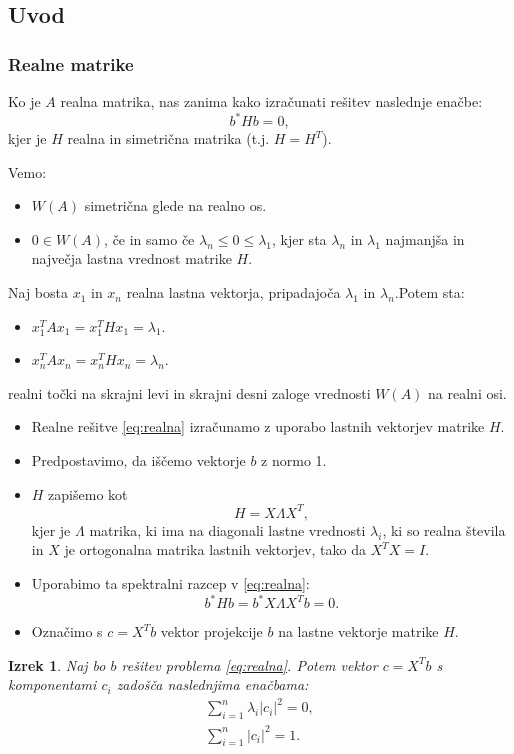 \documentclass{beamer}
\newcommand{\abs}[1]{ \left\lvert#1\right\rvert}
\newtheorem{izrek}{Izrek}
\begin{document}
\subsection{Uvod}
\begin{frame}
\frametitle{Realne matrike}
\begin{block}{}
Ko je $A$ realna matrika, nas zanima kako izračunati rešitev naslednje enačbe:
\begin{equation}\label{eq:realna}
b^\ast Hb=0,
\end{equation}
kjer je $H$ realna in simetrična matrika (t.j. $H=H^T$).
\end{block}\pause
Vemo:
\begin{itemize}
\item $W(A)$ simetrična glede na realno os.
\item $0 \in W(A)$, če in samo če $\lambda_n\le0\le\lambda_1$, kjer sta $\lambda_n$ in $\lambda_1$ najmanjša in največja lastna vrednost matrike $H$.
\end{itemize}
\end{frame}
\begin{frame}
Naj bosta $x_1$ in $x_n$ realna lastna vektorja, pripadajoča $\lambda_1$ in $\lambda_n$.Potem sta:
\begin{itemize}
\item $x_1^T Ax_1=x_1^T Hx_1=\lambda_1$.
\item $x_n^T Ax_n=x_n^T Hx_n=\lambda_n$.
\end{itemize}
realni točki na skrajni levi in skrajni desni zaloge vrednosti $W(A)$ na realni osi.
\begin{itemize}\pause
\item Realne rešitve \eqref{eq:realna} izračunamo z uporabo lastnih vektorjev matrike $H$. 
\item Predpostavimo, da iščemo vektorje $b$ z normo 1.\pause
\item $H$ zapišemo kot $$H=X\Lambda X^T,$$ kjer je $\Lambda$ matrika, ki ima na diagonali lastne vrednosti $\lambda_i$, ki so realna števila in $X$ je ortogonalna matrika lastnih vektorjev, tako da $X^T X=I$.
\end{itemize}
\end{frame}
\begin{frame}
\begin{itemize}
\item Uporabimo ta spektralni razcep v \eqref{eq:realna}: $$b^\ast Hb=b^\ast X\Lambda X^T b=0.$$ 
\item  Označimo s $c=X^Tb$ vektor projekcije $b$ na lastne vektorje matrike $H$. 
\end{itemize}\pause
\begin{izrek} \label{izrek2}
Naj bo $b$ rešitev problema \eqref{eq:realna}. Potem vektor $c=X^T b$ s komponentami $c_i$ zadošča naslednjima enačbama:
\begin{align}
\sum_{i=1}^{n} \lambda_i \abs{c_i}^2=0 \label{eq:en1},\\
\sum_{i=1}^{n}\abs{c_i}^2=1. \label{eq:en2}
\end{align}
\end{izrek}
\end{frame}
\end{document}
